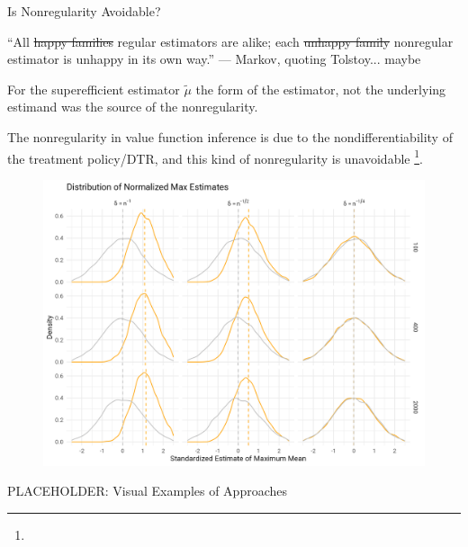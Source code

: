 \documentclass[aspectratio=169, professionalfonts]{beamer}
\begin{document}
\begin{frame}{Is Nonregularity Avoidable?}

	``All \sout{happy families} regular estimators are alike; each \sout{unhappy
		family} nonregular estimator is unhappy in its own way.'' --- Markov,
	quoting Tolstoy\pause... maybe

	\vfill \pause
	For the superefficient estimator $\tilde{\mu}$ the form of the estimator, not
	the underlying estimand was the source of the nonregularity.

	\vfill \pause

	The nonregularity in value function inference is due to the nondifferentiability of the treatment
	policy/DTR, and this kind of nonregularity is unavoidable
	\footnote<4->{}.
	\vfill
\end{frame}

\begin{frame}
	\begin{figure}
		\includegraphics[width=.9\textwidth]{figures/max_means_sim_plot}
	\end{figure}
\end{frame}

\begin{frame}{PLACEHOLDER: Visual Examples of Approaches}
\end{frame}
\end{document}
